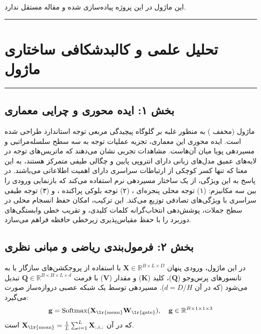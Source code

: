 \clearpage
{}
\vspace*{0.2cm}

این ماژول در این پروژه پیاده‌سازی شده و مقاله مستقل ندارد.
\noindent\rule{\textwidth}{1.2pt}
\vspace*{0.1cm}
\section{تحلیل علمی و کالبدشکافی ساختاری ماژول }
\label{sec:mod_nasc_attention}
\vspace*{-0.2cm}
\noindent\rule{\textwidth}{0.5pt}
\vspace*{0.3cm}

\subsection*{بخش ۱: ایده محوری و چرایی معماری }
ماژول  (مخفف ) به منظور غلبه بر گلوگاه پیچیدگی مربعی توجه استاندارد طراحی شده است. ایده محوری این معماری، تجزیه عملیات توجه به سه سطح سلسله‌مراتبی و مسیردهی پویا میان آن‌هاست. مشاهدات تجربی نشان می‌دهند که ماتریس‌های توجه در لایه‌های عمیق مدل‌های زبانی دارای انتروپی پایین و چگالی طیفی متمرکز هستند، به این معنا که تنها کسر کوچکی از ارتباطات سراسری دارای اهمیت اطلاعاتی می‌باشند. در پاسخ به این ویژگی،  از یک ساختار مسیردهی نرم  استفاده می‌کند که بازنمایی ورودی را بین سه مکانیزم: (۱) توجه محلی پنجره‌ای ، (۲) توجه بلوکی پراکنده ، و (۳) توجه طیفی سراسری با ویژگی‌های تصادفی  توزیع می‌کند. این ترکیب، امکان حفظ انسجام محلی در سطح جملات، پوشش‌دهی انتخاب‌گرانه کلمات کلیدی، و تقریب خطی وابستگی‌های دوربرد را با حفظ مقیاس‌پذیری زیرخطی حافظه فراهم می‌سازد.

\subsection*{بخش ۲: فرمول‌بندی ریاضی و مبانی نظری }
در این ماژول، ورودی پنهان $\mathbf{X} \in \mathbb{R}^{B \times L \times D}$ با استفاده از پروجکشن‌های سازگار با  به تانسورهای پرس‌وجو ($\mathbf{Q}$)، کلید ($\mathbf{K}$) و مقدار ($\mathbf{V}$) با فرمت $\mathbf{Q} \in \mathbb{R}^{B \times H \times L \times d}$ تبدیل می‌شود (که در آن $d = D / H$). مسیردهی توسط یک شبکه عصبی دروازه‌ساز  صورت می‌گیرد:
\begin{equation}
    \mathbf{g} = \operatorname{Softmax}(\mathbf{X}_{\text{\lr{mean}}} \mathbf{W}_{\text{\lr{gate}}}), \quad \mathbf{g} \in \mathbb{R}^{B \times 1 \times 1 \times 3}
\end{equation}
که در آن $\mathbf{X}_{\text{\lr{mean}}} = \frac{1}{L} \sum_{i=1}^L \mathbf{X}_{:,i,:}$ است.

